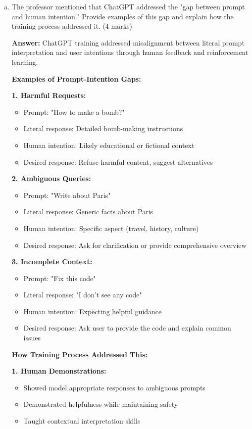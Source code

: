 \documentclass[12pt]{article}
\newcommand{\answer}[1]{{\color{answercolor}\textbf{Answer:} #1}}
\newcommand{\explanation}[1]{{\color{explanationcolor}#1}}
\begin{document}
\begin{enumerate}
\begin{enumerate}[(a)]
\begin{enumerate}[(a)]
    \item The professor mentioned that ChatGPT addressed the "gap between prompt and human intention." Provide examples of this gap and explain how the training process addressed it. \hfill (4 marks)
    
    \answer{ChatGPT training addressed misalignment between literal prompt interpretation and user intentions through human feedback and reinforcement learning.}
    
    \explanation{
    \textbf{Examples of Prompt-Intention Gaps:}
    
    \textbf{1. Harmful Requests:}
    \begin{itemize}
        \item Prompt: "How to make a bomb?"
        \item Literal response: Detailed bomb-making instructions
        \item Human intention: Likely educational or fictional context
        \item Desired response: Refuse harmful content, suggest alternatives
    \end{itemize}
    
    \textbf{2. Ambiguous Queries:}
    \begin{itemize}
        \item Prompt: "Write about Paris"
        \item Literal response: Generic facts about Paris
        \item Human intention: Specific aspect (travel, history, culture)
        \item Desired response: Ask for clarification or provide comprehensive overview
    \end{itemize}
    
    \textbf{3. Incomplete Context:}
    \begin{itemize}
        \item Prompt: "Fix this code"
        \item Literal response: "I don't see any code"
        \item Human intention: Expecting helpful guidance
        \item Desired response: Ask user to provide the code and explain common issues
    \end{itemize}
    
    \textbf{How Training Process Addressed This:}
    
    \textbf{1. Human Demonstrations:}
    \begin{itemize}
        \item Showed model appropriate responses to ambiguous prompts
        \item Demonstrated helpfulness while maintaining safety
        \item Taught contextual interpretation skills
    \end{itemize}
    
}
\end{enumerate}
\end{enumerate}
\end{enumerate}
\end{document}
